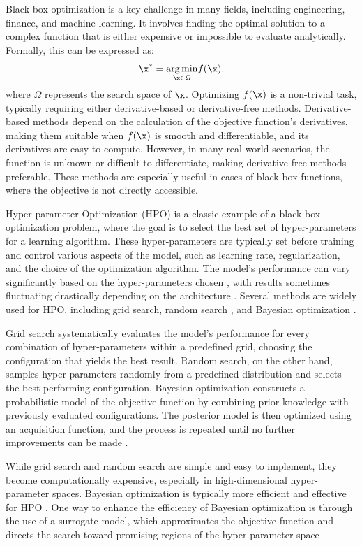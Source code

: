 \documentclass [PhD] {package/uclathes}
\begin{document}
Black-box optimization is a key challenge in many fields, including engineering, finance, and machine learning. It involves finding the optimal solution to a complex function that is either expensive or impossible to evaluate analytically. Formally, this can be expressed as:
$$
\x^* = \underset{\x \in \Omega}{\arg \min} f(\x),
$$
where \(\Omega\) represents the search space of \(\x\). Optimizing \(f(\x)\) is a non-trivial task, typically requiring either derivative-based or derivative-free methods. Derivative-based methods depend on the calculation of the objective function's derivatives, making them suitable when \(f(\x)\) is smooth and differentiable, and its derivatives are easy to compute. However, in many real-world scenarios, the function is unknown or difficult to differentiate, making derivative-free methods preferable. These methods are especially useful in cases of black-box functions, where the objective is not directly accessible.

Hyper-parameter Optimization (HPO) is a classic example of a black-box optimization problem, where the goal is to select the best set of hyper-parameters for a learning algorithm. These hyper-parameters are typically set before training and control various aspects of the model, such as learning rate, regularization, and the choice of the optimization algorithm. The model's performance can vary significantly based on the hyper-parameters chosen \parencite{feurer2019hyperparameter}, with results sometimes fluctuating drastically depending on the architecture \parencite{liu2018darts}. Several methods are widely used for HPO, including grid search, random search \parencite{bergstra2012random}, and Bayesian optimization \parencite{pelikan1999boa}.

Grid search systematically evaluates the model's performance for every combination of hyper-parameters within a predefined grid, choosing the configuration that yields the best result. Random search, on the other hand, samples hyper-parameters randomly from a predefined distribution and selects the best-performing configuration. Bayesian optimization constructs a probabilistic model of the objective function by combining prior knowledge with previously evaluated configurations. The posterior model is then optimized using an acquisition function, and the process is repeated until no further improvements can be made \parencite{brochu2010tutorial}.

While grid search and random search are simple and easy to implement, they become computationally expensive, especially in high-dimensional hyper-parameter spaces. Bayesian optimization is typically more efficient and effective for HPO \parencite{snoek2012practical}. One way to enhance the efficiency of Bayesian optimization is through the use of a surrogate model, which approximates the objective function and directs the search toward promising regions of the hyper-parameter space \parencite{jones1998efficient}.
\end{document}
